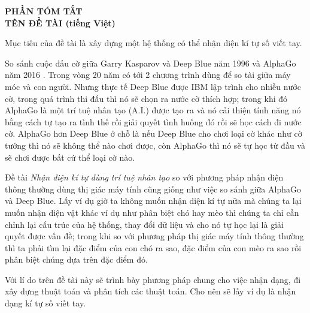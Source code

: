 \documentclass{article}
\begin{document}
\begin{center}
\textbf{PHẦN TÓM TẮT}\\
\vspace{10mm}
\textbf{TÊN ĐỀ TÀI (tiếng Việt)}
\end{center}

\vspace{10mm}
Mục tiêu của đề tài là xây dựng một hệ thống có thể nhận diện kí tự số viết tay.

\vspace{6mm}

So sánh cuộc đấu cờ giữa Garry Kasparov và Deep Blue \cite{deepblue} năm 1996 và AlphaGo năm 2016 \cite{alphago}. Trong vòng 20 năm có tới 2 chương trình dùng để so tài giữa máy móc và con người. Nhưng thực tế Deep Blue được IBM lập trình cho nhiều nước cờ, trong quá trình thi đấu thì nó sẽ chọn ra nước cờ thích hợp; trong khi đó AlphaGo là một trí tuệ nhân tạo (A.I.) được tạo ra và nó cải thiện tính năng nó bằng cách tự tạo ra tình thế rồi giải quyết tình huống đó rồi sẽ học cách đi nước cờ. AlphaGo hơn Deep Blue ở chỗ là nếu Deep Blue cho chơi loại cờ khác như cờ tướng thì nó sẽ không thể nào chơi được, còn AlphaGo thì nó sẽ tự học từ đầu và sẽ chơi được bất cứ thể loại cờ nào.

\vspace{6mm}

Đề tài \emph{Nhận diện kí tự dùng trí tuệ nhân tạo} so với phương pháp nhận diện thông thường dùng thị giác máy tính cũng giống như việc so sánh giữa AlphaGo và Deep Blue. Lấy ví dụ giờ ta không muốn nhận diện kí tự nữa mà chúng ta lại muốn nhận diện vật khác ví dụ như phân biệt chó hay mèo thì chúng ta chỉ cần chỉnh lại cấu trúc của hệ thống, thay đổi dữ liệu và cho nó tự học lại là giải quyết được vấn đề; trong khi so với phương pháp thị giác máy tính thông thường thì ta phải tìm lại đặc điểm của con chó ra sao, đặc điểm của con mèo ra sao rồi phân biệt chúng dựa trên đặc điểm đó.

\vspace{6mm}

Với lí do trên đề tài này sẽ trình bày phương pháp chung cho việc nhận dạng, đi xây dựng thuật toán và phân tích các thuật toán. Cho nên sẽ lấy ví dụ là nhận dạng kí tự số viết tay.
 
\medskip
 
\printbibliography
\end{document}
